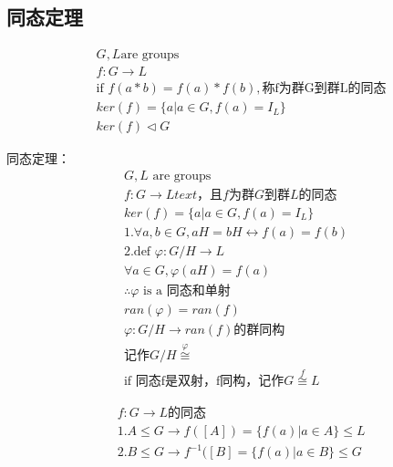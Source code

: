 \documentclass[12pt, a4paper]{article}  %
\begin{document}
\subsection{同态定理}
\begin{align}
    &G,L\text{are groups}\\
    &f:G\rightarrow L\\
    &\text{if } f(a*b)=f(a)*f(b),\text{称f为群G到群L的同态}\\
    &ker(f)=\{a|a\in G,f(a)=I_L\}\\
    &ker(f)\lhd G
\end{align}

同态定理：
\begin{align}
    &G,L \text{ are groups}\\
    &f:G\rightarrow L text{ ，且f为群G到群L的同态}\\
    &ker(f)=\{a|a\in G,f(a)=I_L\}\\
    &1.\forall a,b\in G,aH=bH\leftrightarrow f(a)=f(b)\\
    &2.\text{def }\varphi :G/H\rightarrow L\\
    &\forall a\in G,\varphi(aH)=f(a)\\
    &\therefore \varphi \text{ is a 同态和单射}\\
    &ran(\varphi)=ran(f)\\
    &\varphi:G/H\rightarrow ran(f)\text{的群同构}\\
    &\text{记作} G/H \overset{\varphi}{\cong } 
    &\\
    &\text{if 同态f是双射，f同构，记作} G\overset{f}{\cong } L
\end{align}

\begin{align}
    &f:G\rightarrow L\text{的同态}\\
    &1.A\leqslant G\rightarrow f([A])=\{f(a)|a\in A\}\leqslant L\\
    &2.B\leqslant G\rightarrow f^{-1}([B]=\{f(a)|a\in B\}\leqslant G
\end{align}
\end{document}
